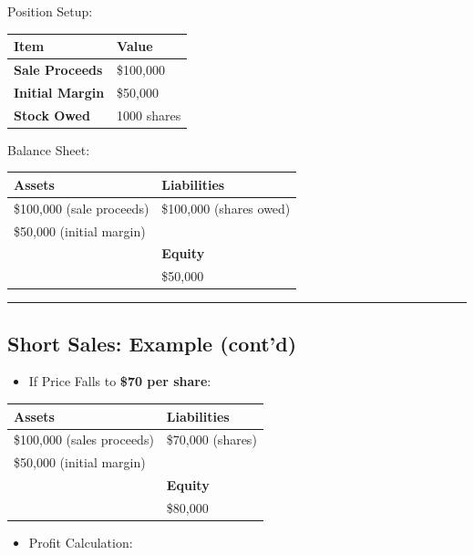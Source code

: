 \documentclass[
  letterpaper,
  DIV=11,
  numbers=noendperiod]{scrartcl}
\providecommand{\tightlist}{%
  \setlength{\itemsep}{0pt}\setlength{\parskip}{0pt}}\usepackage{longtable,booktabs,array}
\begin{document}
Position Setup:

\begin{longtable}[]{@{}ll@{}}
\toprule\noalign{}
Item & Value \\
\midrule\noalign{}
\endhead
\bottomrule\noalign{}
\endlastfoot
\textbf{Sale Proceeds} & \$100,000 \\
\textbf{Initial Margin} & \$50,000 \\
\textbf{Stock Owed} & 1000 shares \\
\end{longtable}

Balance Sheet:

\begin{longtable}[]{@{}ll@{}}
\toprule\noalign{}
\textbf{Assets} & \textbf{Liabilities} \\
\midrule\noalign{}
\endhead
\bottomrule\noalign{}
\endlastfoot
\$100,000 (sale proceeds) & \$100,000 (shares owed) \\
\$50,000 (initial margin) & \\
& \textbf{Equity} \\
& \$50,000 \\
\end{longtable}

\begin{center}\rule{0.5\linewidth}{0.5pt}\end{center}

\subsection{Short Sales: Example
(cont'd)}\label{short-sales-example-contd}

\begin{itemize}
\tightlist
\item
  If Price Falls to \textbf{\$70 per share}:
\end{itemize}

\begin{longtable}[]{@{}ll@{}}
\toprule\noalign{}
\textbf{Assets} & \textbf{Liabilities} \\
\midrule\noalign{}
\endhead
\bottomrule\noalign{}
\endlastfoot
\$100,000 (sales proceeds) & \$70,000 (shares) \\
\$50,000 (initial margin) & \\
& \textbf{Equity} \\
& \$80,000 \\
\end{longtable}

\begin{itemize}
\tightlist
\item
  Profit Calculation:
\end{itemize}
\end{document}

